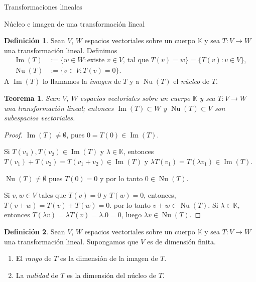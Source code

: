 \documentclass[a4paper,12pt,twoside,spanish]{amsbook}
\newtheorem{teorema}{Teorema}[section]
\theoremstyle{definition}
\newtheorem{definicion}{Definici\'on}[section]
\theoremstyle{remark}
\newcommand{\img}{\operatorname{Im}}
\newcommand{\nuc}{\operatorname{Nu}}
\newcommand{\K}{\mathbb K}
\begin{document}
\begin{chapter}{Transformaciones lineales}
\begin{section}{Núcleo e imagen de una transformación lineal}
		\begin{definicion}
			Sean $V$, $W$ espacios vectoriales sobre un cuerpo $\K$ y sea $T:V \to W$ una transformación lineal.  Definimos
			\begin{align*}
				\img(T) &:= \{w \in W:\text{existe $v \in V$, tal que } T(v)=w\} = \{T(v): v \in V \}, \\
				\nuc(T) &:= \{v \in V: T(v)=0 \}. 
			\end{align*}
			A $\img(T)$ lo llamamos la \textit{imagen} de $T$ y a $ \nuc(T)$ el \textit{núcleo} de $T$. 
		\end{definicion}
		
		\begin{teorema}
			Sean $V$, $W$ espacios vectoriales sobre un cuerpo $\K$ y sea $T:V \to W$ una transformación lineal; entonces $\img(T) \subset W$ y $\nuc(T) \subset V$ son subespacios vectoriales.
		\end{teorema}
		\begin{proof}
			$\img(T) \ne \emptyset$, pues $0 = T(0) \in \img(T)$. 
			
			Si $T(v_1),T(v_2) \in \img(T)$ y $\lambda \in \K$,  entonces $T(v_1) + T(v_2) = T(v_1+v_2) \in \img(T)$ y $\lambda T(v_1) = T(\lambda v_1) \in \img(T)$.
			
			
			$\nuc(T) \ne \emptyset$ pues $T(0) =0$ y por lo tanto $0 \in \nuc(T)$.
			
			Si $v,w \in V$ tales que $T(v) =0$ y $T(w)=0$,  entonces, $T(v+w)= T(v)+T(w) =0$. por lo tanto $v+w \in \nuc(T)$. Si  $\lambda \in \K$,  entonces $T(\lambda v) = \lambda T(v) = \lambda.0 =0$, luego  $\lambda v \in \nuc(T)$.
		\end{proof}

	
		\begin{definicion}
			Sean $V$, $W$ espacios vectoriales sobre un cuerpo $\K$ y sea $T:V \to W$ una transformación lineal. Supongamos que $V$ es de dimensión finita.
			\begin{enumerate}
\item El \textit{rango} de $T$ es la dimensión de la imagen de $T$.
\item La \textit{nulidad} de $T$ es la dimensión del núcleo  de $T$.
			\end{enumerate}
			
		\end{definicion}
				

\end{section}
\end{chapter}
\end{document}
